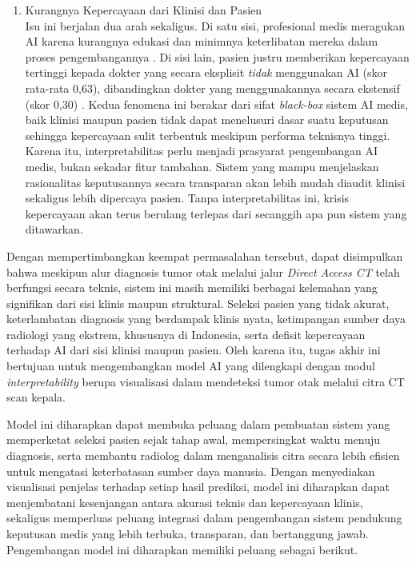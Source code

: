 \begin{enumerate}
	\item Kurangnya Kepercayaan dari Klinisi dan Pasien \\
	Isu ini berjalan dua arah sekaligus. Di satu sisi, profesional medis meragukan AI karena kurangnya edukasi dan minimnya keterlibatan mereka dalam proses pengembangannya \autocite{syaftahan2025transformasi}. Di sisi lain, pasien justru memberikan kepercayaan tertinggi kepada dokter yang secara eksplisit \textit{tidak} menggunakan AI (skor rata-rata 0,63), dibandingkan dokter yang menggunakannya secara ekstensif (skor 0,30) \autocite{chen2025impact}. Kedua fenomena ini berakar dari sifat \textit{black-box} sistem AI medis, baik klinisi maupun pasien tidak dapat menelusuri dasar suatu keputusan sehingga kepercayaan sulit terbentuk meskipun performa teknisnya tinggi. Karena itu, interpretabilitas perlu menjadi prasyarat pengembangan AI medis, bukan sekadar fitur tambahan. Sistem yang mampu menjelaskan rasionalitas keputusannya secara transparan akan lebih mudah diaudit klinisi sekaligus lebih dipercaya pasien. Tanpa interpretabilitas ini, krisis kepercayaan akan terus berulang terlepas dari secanggih apa pun sistem yang ditawarkan.
\end{enumerate}

Dengan mempertimbangkan keempat permasalahan tersebut, dapat disimpulkan bahwa meskipun alur diagnosis tumor otak melalui jalur \textit{Direct Access CT} telah berfungsi secara teknis, sistem ini masih memiliki berbagai kelemahan yang signifikan dari sisi klinis maupun struktural. Seleksi pasien yang tidak akurat, keterlambatan diagnosis yang berdampak klinis nyata, ketimpangan sumber daya radiologi yang ekstrem, khususnya di Indonesia, serta defisit kepercayaan terhadap AI dari sisi klinisi maupun pasien. Oleh karena itu, tugas akhir ini bertujuan untuk mengembangkan model AI yang dilengkapi dengan modul \textit{interpretability} berupa visualisasi dalam mendeteksi tumor otak melalui citra CT scan kepala.

Model ini diharapkan dapat membuka peluang dalam pembuatan sistem yang memperketat seleksi pasien sejak tahap awal, mempersingkat waktu menuju diagnosis, serta membantu radiolog dalam menganalisis citra secara lebih efisien untuk mengatasi keterbatasan sumber daya manusia. Dengan menyediakan visualisasi penjelas terhadap setiap hasil prediksi, model ini diharapkan dapat menjembatani kesenjangan antara akurasi teknis dan kepercayaan klinis, sekaligus memperluas peluang integrasi dalam pengembangan sistem pendukung keputusan medis yang lebih terbuka, transparan, dan bertanggung jawab. Pengembangan model ini diharapkan memiliki peluang sebagai berikut.

